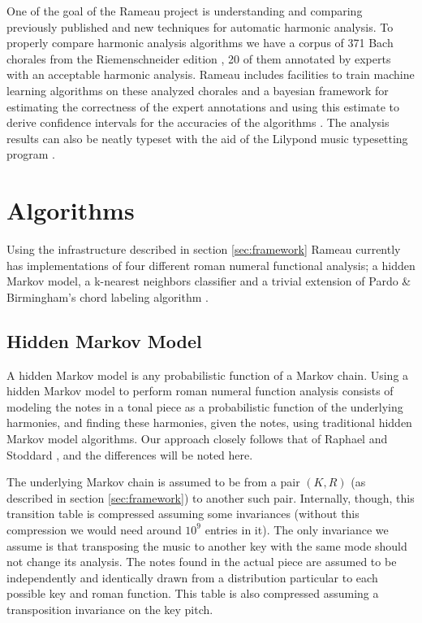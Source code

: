 One of the goal of the Rameau project is understanding and comparing
previously published and new techniques for automatic harmonic
analysis. To properly compare harmonic analysis algorithms we have a
corpus of 371 Bach chorales from the Riemenschneider edition
\cite{bach41:371}, 20 of them annotated by experts with an acceptable
harmonic analysis. Rameau includes facilities to train machine
learning algorithms on these analyzed chorales and a bayesian
framework for estimating the correctness of the expert annotations and
using this estimate to derive confidence intervals for the accuracies
of the algorithms . The analysis results can
also be neatly typeset with the aid of the Lilypond music typesetting
program \cite{nienhuys.ea08:lilypond}.

\section{Algorithms}
\label{sec:algorithms}

Using the infrastructure described in section \ref{sec:framework}
Rameau currently has implementations of four different roman numeral
functional analysis; a hidden Markov model, a k-nearest neighbors
classifier and a trivial extension of Pardo \& Birmingham's chord
labeling algorithm \cite{pardo.ea99:automated}.

\subsection{Hidden Markov Model}
\label{sec:hidden-markov-model}

A hidden Markov model is any probabilistic function of a Markov
chain. Using a hidden Markov model to perform roman numeral function
analysis consists of modeling the notes in a tonal piece as a
probabilistic function of the underlying harmonies, and finding these
harmonies, given the notes, using traditional hidden Markov model
algorithms. Our approach closely follows that of Raphael and Stoddard
\cite{raphael.ea03:harmonic}, and the differences will be noted here.

The underlying Markov chain is assumed to be from a pair $(K,R)$ (as
described in section \ref{sec:framework}) to another such
pair. Internally, though, this transition table is compressed assuming
some invariances (without this compression we would need around $10^9$
entries in it). The only invariance we assume is that transposing the
music to another key with the same mode should not change its
analysis. The notes found in the actual piece are assumed to be
independently and identically drawn from a distribution particular to
each possible key and roman function. This table is also compressed
assuming a transposition invariance on the key pitch. 

